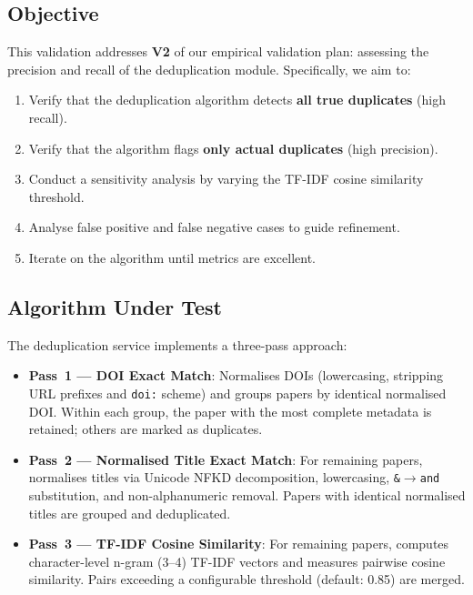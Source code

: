 \documentclass[conference]{IEEEtran}
\begin{document}
\subsection{Objective}

This validation addresses \textbf{V2} of our empirical validation plan: assessing the precision and recall of the deduplication module. Specifically, we aim to:

\begin{enumerate}
    \item Verify that the deduplication algorithm detects \textbf{all true duplicates} (high recall).
    \item Verify that the algorithm flags \textbf{only actual duplicates} (high precision).
    \item Conduct a sensitivity analysis by varying the TF-IDF cosine similarity threshold.
    \item Analyse false positive and false negative cases to guide refinement.
    \item Iterate on the algorithm until metrics are excellent.
\end{enumerate}

\subsection{Algorithm Under Test}

The deduplication service implements a three-pass approach:

\begin{itemize}
    \item \textbf{Pass~1 --- DOI Exact Match}: Normalises DOIs (lowercasing, stripping URL prefixes and \texttt{doi:} scheme) and groups papers by identical normalised DOI. Within each group, the paper with the most complete metadata is retained; others are marked as duplicates.
    \item \textbf{Pass~2 --- Normalised Title Exact Match}: For remaining papers, normalises titles via Unicode NFKD decomposition, lowercasing, \texttt{\&}$\rightarrow$\texttt{and} substitution, and non-alphanumeric removal. Papers with identical normalised titles are grouped and deduplicated.
    \item \textbf{Pass~3 --- TF-IDF Cosine Similarity}: For remaining papers, computes character-level n-gram (3--4) TF-IDF vectors and measures pairwise cosine similarity. Pairs exceeding a configurable threshold (default: 0.85) are merged.
\end{itemize}
\end{document}
